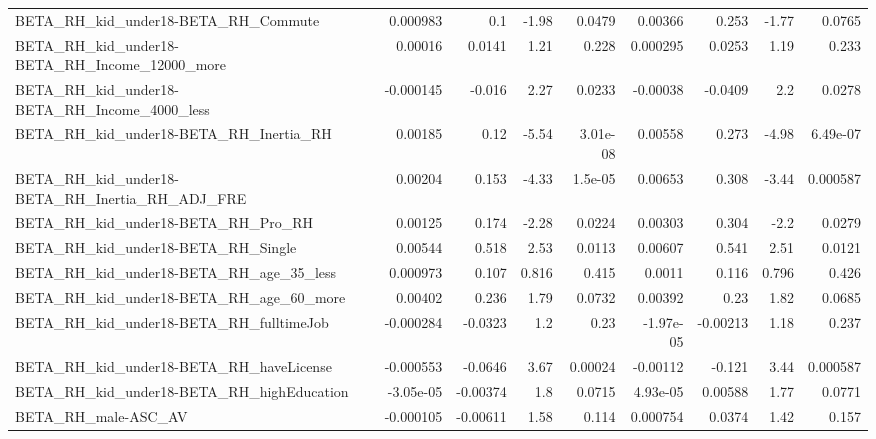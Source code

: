 \begin{tabular}{lrrrrrrrr}
BETA\_RH\_kid\_under18-BETA\_RH\_Commute                &    0.000983 &          0.1 &    -1.98 &   0.0479 &    0.00366 &       0.253 &        -1.77 &        0.0765 \\
BETA\_RH\_kid\_under18-BETA\_RH\_Income\_12000\_more      &     0.00016 &       0.0141 &     1.21 &    0.228 &   0.000295 &      0.0253 &         1.19 &         0.233 \\
BETA\_RH\_kid\_under18-BETA\_RH\_Income\_4000\_less       &   -0.000145 &       -0.016 &     2.27 &   0.0233 &   -0.00038 &     -0.0409 &          2.2 &        0.0278 \\
BETA\_RH\_kid\_under18-BETA\_RH\_Inertia\_RH             &     0.00185 &         0.12 &    -5.54 & 3.01e-08 &    0.00558 &       0.273 &        -4.98 &      6.49e-07 \\
BETA\_RH\_kid\_under18-BETA\_RH\_Inertia\_RH\_ADJ\_FRE     &     0.00204 &        0.153 &    -4.33 &  1.5e-05 &    0.00653 &       0.308 &        -3.44 &      0.000587 \\
BETA\_RH\_kid\_under18-BETA\_RH\_Pro\_RH                 &     0.00125 &        0.174 &    -2.28 &   0.0224 &    0.00303 &       0.304 &         -2.2 &        0.0279 \\
BETA\_RH\_kid\_under18-BETA\_RH\_Single                 &     0.00544 &        0.518 &     2.53 &   0.0113 &    0.00607 &       0.541 &         2.51 &        0.0121 \\
BETA\_RH\_kid\_under18-BETA\_RH\_age\_35\_less            &    0.000973 &        0.107 &    0.816 &    0.415 &     0.0011 &       0.116 &        0.796 &         0.426 \\
BETA\_RH\_kid\_under18-BETA\_RH\_age\_60\_more            &     0.00402 &        0.236 &     1.79 &   0.0732 &    0.00392 &        0.23 &         1.82 &        0.0685 \\
BETA\_RH\_kid\_under18-BETA\_RH\_fulltimeJob            &   -0.000284 &      -0.0323 &      1.2 &     0.23 &  -1.97e-05 &    -0.00213 &         1.18 &         0.237 \\
BETA\_RH\_kid\_under18-BETA\_RH\_haveLicense            &   -0.000553 &      -0.0646 &     3.67 &  0.00024 &   -0.00112 &      -0.121 &         3.44 &      0.000587 \\
BETA\_RH\_kid\_under18-BETA\_RH\_highEducation          &   -3.05e-05 &     -0.00374 &      1.8 &   0.0715 &   4.93e-05 &     0.00588 &         1.77 &        0.0771 \\
BETA\_RH\_male-ASC\_AV                                &   -0.000105 &     -0.00611 &     1.58 &    0.114 &   0.000754 &      0.0374 &         1.42 &         0.157 \\

\end{tabular}
